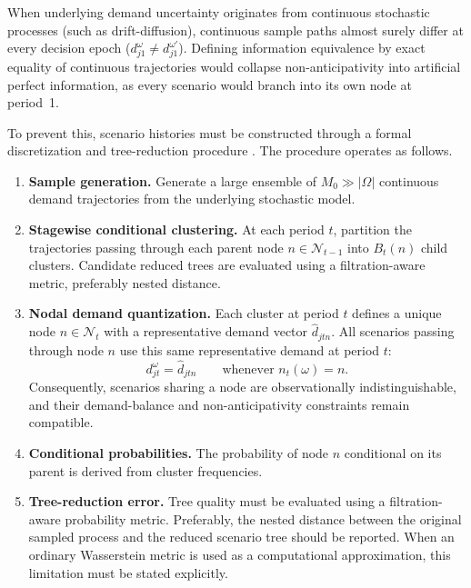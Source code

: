 \documentclass[11pt,a4paper]{article}
\begin{document}
When underlying demand uncertainty originates from continuous stochastic
processes (such as drift-diffusion), continuous sample paths almost surely
differ at every decision epoch (\(d_{j1}^{\omega}\neq d_{j1}^{\omega'}\)).
Defining information equivalence by exact equality of continuous trajectories
would collapse non-anticipativity into artificial perfect information, as
every scenario would branch into its own node at period~1.

To prevent this, scenario histories must be constructed through a formal
discretization and tree-reduction procedure
\citep{dupacova2003scenarios,heitsch2009scenario}. The procedure operates as
follows.

\begin{enumerate}
  \item \textbf{Sample generation.} Generate a large ensemble of
  \(M_0\gg|\Omega|\) continuous demand trajectories from the underlying
  stochastic model.

  \item \textbf{Stagewise conditional clustering.} At each period \(t\),
  partition the trajectories passing through each parent node
  \(n\in\mathcal{N}_{t-1}\) into \(B_t(n)\) child clusters. Candidate
  reduced trees are evaluated using a filtration-aware metric,
  preferably nested distance.

  \item \textbf{Nodal demand quantization.} Each cluster at period \(t\)
  defines a unique node \(n\in\mathcal{N}_t\) with a representative demand
  vector \(\widehat{d}_{jtn}\). All scenarios passing through node \(n\) use
  this same representative demand at period \(t\):
  \begin{equation}
    d_{jt}^{\omega}
    =
    \widehat{d}_{jtn}
    \qquad
    \text{whenever }n_t(\omega)=n.
    \label{eq:nodal-demand}
  \end{equation}
  Consequently, scenarios sharing a node are observationally
  indistinguishable, and their demand-balance and non-anticipativity
  constraints remain compatible.

  \item \textbf{Conditional probabilities.} The probability of node \(n\)
  conditional on its parent is derived from cluster frequencies.

  \item \textbf{Tree-reduction error.} Tree quality must be evaluated
  using a filtration-aware probability metric. Preferably, the nested
  distance between the original sampled process and the reduced scenario
  tree should be reported. When an ordinary Wasserstein metric is used
  as a computational approximation, this limitation must be stated
  explicitly.
\end{enumerate}
\end{document}
